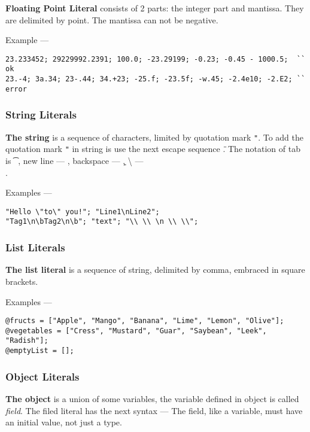 {\bf Floating Point Literal} consists of 2 parts: the integer part and mantissa. They are delimited by point. The mantissa can not be negative.

Example —
\begin{verbatim}
23.233452; 29229992.2391; 100.0; -23.29199; -0.23; -0.45 - 1000.5;  `` ok
23.-4; 3a.34; 23-.44; 34.+23; -25.f; -23.5f; -w.45; -2.4e10; -2.E2; `` error
\end{verbatim}

\subsubsection{String Literals}

{\bf The string} is a sequence of characters, limited by quotation mark \texttt{"}. To add the quotation mark \texttt{"} in string is use the next escape sequence \texttt{\"}. The notation of tab is \texttt{\t}, new line — \texttt{\n}, backspace — \texttt{\b}, \textbackslash{} — \texttt{\\}.

Examples —
\begin{verbatim}
"Hello \"to\" you!"; "Line1\nLine2";
"Tag1\n\bTag2\n\b"; "text"; "\\ \\ \n \\ \\";
\end{verbatim}

\subsubsection{List Literals}

{\bf The list literal} is a sequence of string, delimited by comma, embraced in square brackets.

Examples —
\begin{verbatim}
@fructs = ["Apple", "Mango", "Banana", "Lime", "Lemon", "Olive"];
@vegetables = ["Cress", "Mustard", "Guar", "Saybean", "Leek", "Radish"];
@emptyList = [];
\end{verbatim}

\subsubsection{Object Literals}

{\bf The object} is a union of some variables, the variable defined in object is called {\it field}. The filed literal has the next syntax —
The field, like a variable, must have an initial value, not just a type.

